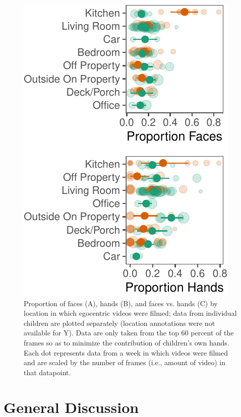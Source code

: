 \documentclass[10pt, letterpaper]{article}
\newenvironment{CodeChunk}{}{}
\begin{document}
\begin{CodeChunk}
\begin{figure}[h]

{\centering \includegraphics{figs/DetByLocation-1} 

}

\caption[Proportion of faces (A),  hands (B), and faces vs]{Proportion of faces (A),  hands (B), and faces vs. hands  (C) by location in which egocentric videos were filmed; data from individual children are plotted separately (location annotations were not available for Y). Data are only taken from the top 60 percent of the frames so as to minimize the contribution of children’s own hands. Each dot represents data from a week in which videos were filmed and are scaled by the number of frames (i.e., amount of video) in that datapoint.}\label{fig:DetByLocation}
\end{figure}
\end{CodeChunk}

\section{General Discussion}\label{general-discussion}
\end{document}
